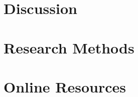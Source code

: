 \documentclass[manuscript,screen,review,acmsmall]{acmart}
\begin{document}
\section{Discussion}


\begin{acks}

\end{acks}




\appendix

\section{Research Methods}

\section{Online Resources}
\end{document}
